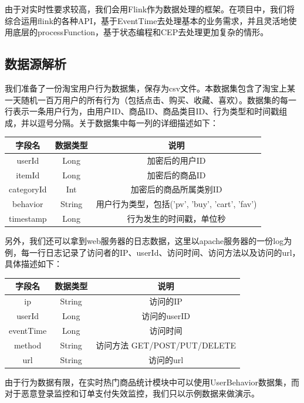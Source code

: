 \documentclass[oneside]{ctexbook}
\begin{document}
由于对实时性要求较高，我们会用Flink作为数据处理的框架。在项目中，我们将综合运用flink的各种API，基于EventTime去处理基本的业务需求，并且灵活地使用底层的processFunction，基于状态编程和CEP去处理更加复杂的情形。

\subsection{数据源解析}

我们准备了一份淘宝用户行为数据集，保存为csv文件。本数据集包含了淘宝上某一天随机一百万用户的所有行为（包括点击、购买、收藏、喜欢）。数据集的每一行表示一条用户行为，由用户ID、商品ID、商品类目ID、行为类型和时间戳组成，并以逗号分隔。关于数据集中每一列的详细描述如下：

\begin{table}[]
\begin{tabular}{|c|c|c|}
\hline 字段名 & 数据类型 & 说明 \\ \hline
  userId & Long & 加密后的用户ID \\ \hline
  itemId & Long & 加密后的商品ID \\ \hline
  categoryId & Int & 加密后的商品所属类别ID \\ \hline
  behavior & String & 用户行为类型，包括('pv', 'buy', 'cart', 'fav') \\ \hline
  timestamp & Long & 行为发生的时间戳，单位秒 \\ \hline
\end{tabular}
\end{table}

另外，我们还可以拿到web服务器的日志数据，这里以apache服务器的一份log为例，每一行日志记录了访问者的IP、userId、访问时间、访问方法以及访问的url，具体描述如下：

\begin{table}[]
\begin{tabular}{|c|c|c|}
\hline 字段名 & 数据类型 & 说明 \\ \hline
  ip & String & 访问的IP \\ \hline
  userId & Long & 访问的userID \\ \hline
  eventTime & Long & 访问时间 \\ \hline
  method & String & 访问方法 GET/POST/PUT/DELETE \\ \hline
  url & String & 访问的url \\ \hline
\end{tabular}
\end{table}

由于行为数据有限，在实时热门商品统计模块中可以使用UserBehavior数据集，而对于恶意登录监控和订单支付失效监控，我们只以示例数据来做演示。
\end{document}
